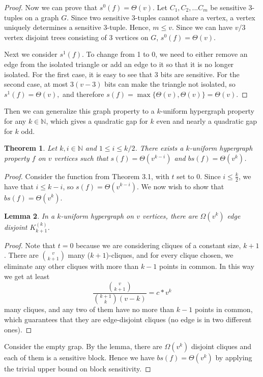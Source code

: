 \documentclass[psamsfonts]{amsart}
\newtheorem{theorem}{Theorem}[section]
\newtheorem{lem}[theorem]{Lemma}
\theoremstyle{definition}
\theoremstyle{remark}
\numberwithin{equation}{section}
\begin{document}
\begin{proof}
	Now we can prove that $s^0(f) = \Theta(v)$. Let $C_1, C_2, ... C_m$ be sensitive 3-tuples on a graph $G$. Since two sensitive 3-tuples cannot share a vertex, a vertex uniquely determines a sensitive 3-tuple. Hence, $m \leq v$. Since we can have $v/3$ vertex disjoint trees consisting of 3 vertices on $G$, $s^0(f) = \Theta(v)$.

	Next we consider $s^1(f)$. To change from 1 to 0, we need to either remove an edge from the isolated triangle or add an edge to it so that it is no longer isolated. For the first case, it is easy to see that 3 bits are sensitive. For the second case, at most $3(v-3)$ bits can make the triangle not isolated, so $s^1(f) = \Theta(v),$ and therefore $s(f) = \max\{\Theta(v),\Theta(v)\}=\Theta(v)$.
	\end{proof}


	Then we can generalize this graph property to a $k$-uniform hypergraph property for any $k \in \mathbb{N}$, which gives a quadratic gap for $k$ even and nearly a quadratic gap for $k$ odd.
	\begin{theorem}
		Let $k,i \in \mathbb{N}$ and $1 \leq i \leq k/2$.  There exists a $k$-uniform hypergraph property $f$ on $v$ vertices such that $s(f) = \Theta(v^{k-i})$ and $bs(f) = \Theta(v^{k})$.
	\end{theorem}
	\begin{proof}
		Consider the function from Theorem 3.1, with $t$ set to 0. Since $i\leq\frac{k}{2}$, we have that $i\leq k-i$, so $s(f)=\Theta(v^{k-i})$. We now wish to show that $bs(f)=\Theta(v^k)$.
		\begin{lem}
			In a $k$-uniform hypergraph on $v$ vertices, there are $\Omega (v^k)$ edge disjoint $K_{k+1}^{(k)}$.
		\end{lem}
		\begin{proof}
			Note that $t=0$ because we are considering cliques of a constant size, $k+1$.  There are $v \choose{k+1}$  many ($k+1$)-cliques, and for every clique chosen, we eliminate any other cliques with more than $k-1$ points in common. In this way we get at least
		\begin{equation}
			\frac{{v \choose{k+1}}}{{k+1 \choose{k}}(v-k)} = c*v^{k} \nonumber
		\end{equation}		 
		many cliques, and any two of them have no more than $k-1$ points in common, which guarantees that they are edge-disjoint cliques (no edge is in two different ones).
		\end{proof}
		Consider the empty grap. By the lemma, there are $\Omega (v^k)$ disjoint cliques and each of them is a sensitive block. Hence we have $bs(f) = \Theta (v^k)$ by applying the trivial upper bound on block sensitivity.
	\end{proof}
	
\end{document}
